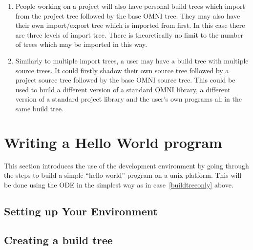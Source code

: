 \documentclass[11pt,twoside,onecolumn]{article}
\begin{document}
\begin{enumerate}
\item People working on a project will also have personal build trees which
import from the project tree followed by the base OMNI tree.  They may also
have their own import/export tree which is imported from first.  In this case
there are three levels of import tree.  There is theoretically no limit to the
number of trees which may be imported in this way.

\item Similarly to multiple import trees, a user may have a build tree with
multiple source trees.  It could firstly shadow their own source tree followed
by a project source tree followed by the base OMNI source tree.  This could be
used to build a different version of a standard OMNI library, a different
version of a standard project library and the user's own programs all in the
same build tree.

\end{enumerate}

\section{Writing a Hello World program}

This section introduces the use of the development environment by going through
the steps to build a simple ``hello world'' program on a unix platform.  This
will be done using the ODE in the simplest way as in case~\ref{buildtreeonly}
above.

\subsection{Setting up Your Environment}
\label{settingenv}


\subsection{Creating a build tree}
\end{document}
